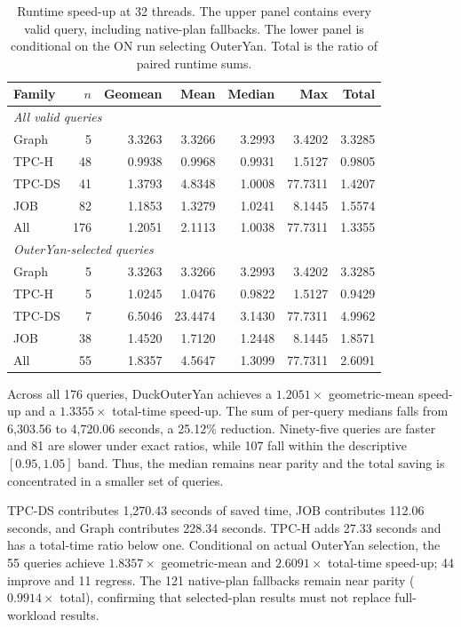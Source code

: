 \begin{table}[t]
\centering
\small
\setlength{\tabcolsep}{6pt}
\caption{Runtime speed-up at 32 threads. The upper panel contains every valid
query, including native-plan fallbacks. The lower panel is conditional on the
ON run selecting OuterYan. Total is the ratio of paired runtime sums.}
\label{tab:runtime-by-benchmark}
\begin{tabular}{lrrrrrr}
\toprule
Family & $n$ & Geomean & Mean & Median & Max & Total \\
\midrule
\multicolumn{7}{l}{\textit{All valid queries}} \\
Graph  &  5 & 3.3263 & 3.3266 & 3.2993 &  3.4202 & 3.3285 \\
TPC-H  & 48 & 0.9938 & 0.9968 & 0.9931 &  1.5127 & 0.9805 \\
TPC-DS & 41 & 1.3793 & 4.8348 & 1.0008 & 77.7311 & 1.4207 \\
JOB    & 82 & 1.1853 & 1.3279 & 1.0241 &  8.1445 & 1.5574 \\
All    &176 & 1.2051 & 2.1113 & 1.0038 & 77.7311 & 1.3355 \\
\midrule
\multicolumn{7}{l}{\textit{OuterYan-selected queries}} \\
Graph  & 5 & 3.3263 &  3.3266 & 3.2993 &  3.4202 & 3.3285 \\
TPC-H  & 5 & 1.0245 &  1.0476 & 0.9822 &  1.5127 & 0.9429 \\
TPC-DS & 7 & 6.5046 & 23.4474 & 3.1430 & 77.7311 & 4.9962 \\
JOB    &38 & 1.4520 &  1.7120 & 1.2448 &  8.1445 & 1.8571 \\
All    &55 & 1.8357 &  4.5647 & 1.3099 & 77.7311 & 2.6091 \\
\bottomrule
\end{tabular}
\end{table}

Across all 176 queries, DuckOuterYan achieves a $1.2051\times$ geometric-mean
speed-up and a $1.3355\times$ total-time speed-up. The sum of per-query medians
falls from 6,303.56 to 4,720.06 seconds, a 25.12\% reduction. Ninety-five
queries are faster and 81 are slower under exact ratios, while 107 fall within
the descriptive $[0.95,1.05]$ band. Thus, the median remains near parity and
the total saving is concentrated in a smaller set of queries.

TPC-DS contributes 1,270.43 seconds of saved time, JOB contributes 112.06
seconds, and Graph contributes 228.34 seconds. TPC-H adds 27.33 seconds and has
a total-time ratio below one. Conditional on actual OuterYan selection, the 55
queries achieve $1.8357\times$ geometric-mean and $2.6091\times$ total-time
speed-up; 44 improve and 11 regress. The 121 native-plan fallbacks remain near
parity ($0.9914\times$ total), confirming that selected-plan results must not
replace full-workload results.

